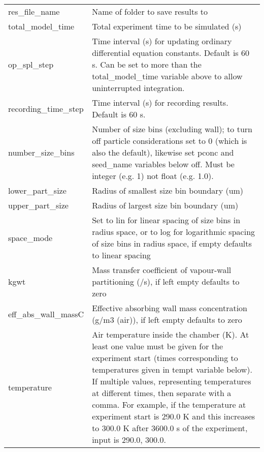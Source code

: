 \documentclass[gmd, manuscript]{copernicus}
\begin{document}
\appendixtables
\begin{center}
\tablelasttail{\bottomhline}

\begin{supertabular}{p{0.15\textwidth}p{0.75\textwidth}}


res\_file\_name & Name of folder to save results to\\

total\_model\_time & Total experiment time to be simulated (s)\\

op\_spl\_step &  Time interval (s) for updating ordinary differential equation constants.  Default is 60 s.  Can be set to more than the total\_model\_time variable above to allow uninterrupted integration.\\

recording\_time\_step &  Time interval (s) for recording results.  Default is 60 s.\\

number\_size\_bins & Number of size bins (excluding wall); to turn off particle considerations set to 0 (which is also the default), likewise set pconc and seed\_name variables below off.  Must be integer (e.g. 1) not float (e.g. 1.0).\\

lower\_part\_size & Radius of smallest size bin boundary (um)\\

upper\_part\_size & Radius of largest size bin boundary (um)\\

space\_mode & Set to lin for linear spacing of size bins in radius space, or to log for logarithmic spacing of size bins in radius space, if empty defaults to linear spacing\\

kgwt & Mass transfer coefficient of vapour-wall partitioning (/s), if left empty defaults to zero\\

eff\_abs\_wall\_massC & Effective absorbing wall mass concentration (g/m3 (air)), if left empty defaults to zero\\

temperature & Air temperature inside the chamber (K).  At least one value must be given for the experiment start (times corresponding to temperatures given in tempt variable below).  If multiple values, representing temperatures at different times, then separate with a comma.  For example, if the temperature at experiment start is 290.0 K and this increases to 300.0 K after 3600.0 s of the experiment, input is 290.0, 300.0.\\


\end{supertabular}
\end{center}
\end{document}
